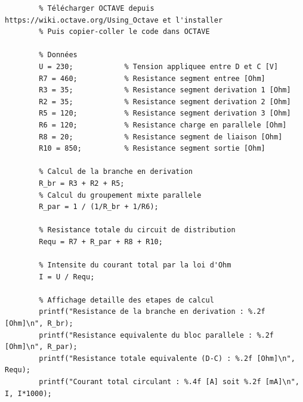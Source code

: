 \documentclass[a4paper,11pt,answers,addpoints]{exam}
\begin{document}
\begin{questions}
\begin{solution}
	\begin{verbatim}
		% Télécharger OCTAVE depuis https://wiki.octave.org/Using_Octave et l'installer
		% Puis copier-coller le code dans OCTAVE
		
		% Données
		U = 230;            % Tension appliquee entre D et C [V]
		R7 = 460;           % Resistance segment entree [Ohm]
		R3 = 35;            % Resistance segment derivation 1 [Ohm]
		R2 = 35;            % Resistance segment derivation 2 [Ohm]
		R5 = 120;           % Resistance segment derivation 3 [Ohm]
		R6 = 120;           % Resistance charge en parallele [Ohm]
		R8 = 20;            % Resistance segment de liaison [Ohm]
		R10 = 850;          % Resistance segment sortie [Ohm]
		
		% Calcul de la branche en derivation
		R_br = R3 + R2 + R5;
		% Calcul du groupement mixte parallele
		R_par = 1 / (1/R_br + 1/R6);
		
		% Resistance totale du circuit de distribution
		Requ = R7 + R_par + R8 + R10;
		
		% Intensite du courant total par la loi d'Ohm
		I = U / Requ;
		
		% Affichage detaille des etapes de calcul
		printf("Resistance de la branche en derivation : %.2f [Ohm]\n", R_br);
		printf("Resistance equivalente du bloc parallele : %.2f [Ohm]\n", R_par);
		printf("Resistance totale equivalente (D-C) : %.2f [Ohm]\n", Requ);
		printf("Courant total circulant : %.4f [A] soit %.2f [mA]\n", I, I*1000);
	\end{verbatim}
	\end{solution}
\end{questions}
\end{document}
